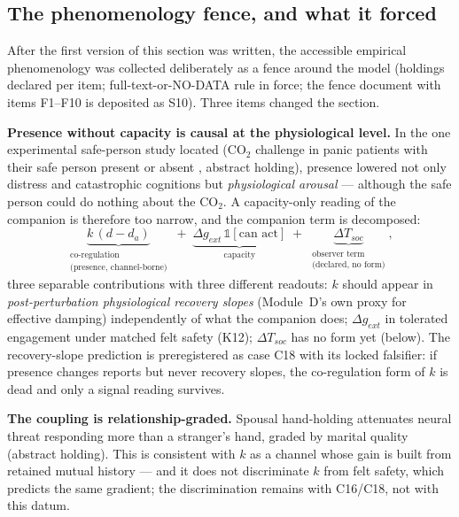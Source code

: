 \documentclass[9pt,twocolumn]{article}
\begin{document}
\subsection{The phenomenology fence, and what it forced}
\label{sec:fence}
After the first version of this section was written, the accessible empirical phenomenology was collected deliberately as a fence around the model (holdings declared per item; full-text-or-NO-DATA rule in force; the fence document with items F1--F10 is deposited as S10). Three items changed the section.

\textbf{Presence without capacity is causal at the physiological level.} In the one experimental safe-person study located (CO$_2$ challenge in panic patients with their safe person present or absent \cite{carter1995}, abstract holding), presence lowered not only distress and catastrophic cognitions but \emph{physiological arousal} --- although the safe person could do nothing about the CO$_2$. A capacity-only reading of the companion is therefore too narrow, and the companion term is decomposed:
\begin{equation}
\underbrace{k\,(d-d_a)}_{\substack{\text{co-regulation}\\ \text{(presence, channel-borne)}}}\;+\;\underbrace{\Delta g_{ext}\,\mathbb 1[\text{can act}]}_{\text{capacity}}\;+\;\underbrace{\Delta T_{soc}}_{\substack{\text{observer term}\\ \text{(declared, no form)}}},
\label{eq:companion}
\end{equation}
three separable contributions with three different readouts: $k$ should appear in \emph{post-perturbation physiological recovery slopes} (Module~D's own proxy for effective damping) independently of what the companion does; $\Delta g_{ext}$ in tolerated engagement under matched felt safety (K12); $\Delta T_{soc}$ has no form yet (below). The recovery-slope prediction is preregistered as case C18 with its locked falsifier: if presence changes reports but never recovery slopes, the co-regulation form of $k$ is dead and only a signal reading survives.

\textbf{The coupling is relationship-graded.} Spousal hand-holding attenuates neural threat responding more than a stranger's hand, graded by marital quality \cite{coan2006} (abstract holding). This is consistent with $k$ as a channel whose gain is built from retained mutual history --- and it does not discriminate $k$ from felt safety, which predicts the same gradient; the discrimination remains with C16/C18, not with this datum.
\end{document}
